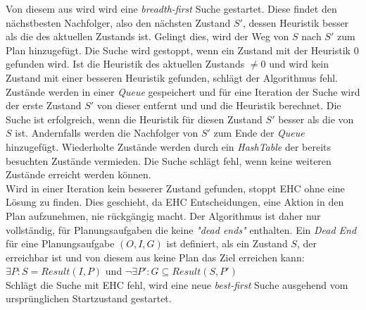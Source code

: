 Von diesem aus wird wird eine \emph{breadth-first} Suche gestartet.
Diese findet den nächstbesten Nachfolger, also den nächsten Zustand $S'$, dessen Heuristik besser als die des aktuellen Zustands ist.
Gelingt dies, wird der Weg von $S$ nach $S'$ zum Plan hinzugefügt.
Die Suche wird gestoppt, wenn ein Zustand mit der Heuristik 0 gefunden wird.
Ist die Heuristik des aktuellen Zustands $\neq 0$ und wird kein Zustand mit einer besseren Heuristik gefunden, schlägt der Algorithmus fehl.
Zustände werden in einer \emph{Queue} gespeichert und für eine Iteration der Suche wird der erste Zustand $S'$ von dieser entfernt und und die Heuristik berechnet.
Die Suche ist erfolgreich, wenn die Heuristik für diesen Zustand $S'$ besser als die von $S$ ist.
Andernfalls werden die Nachfolger von $S'$ zum Ende der \emph{Queue} hinzugefügt.
Wiederholte Zustände werden durch ein \emph{HashTable} der bereits besuchten Zustände vermieden.
Die Suche schlägt fehl, wenn keine weiteren Zustände erreicht werden können.\\
Wird in einer Iteration kein besserer Zustand gefunden, stoppt \ac{EHC} ohne eine Lösung zu finden.
Dies geschieht, da \ac{EHC} Entscheidungen, eine Aktion in den Plan aufzunehmen, nie rückgängig macht.
Der Algorithmus ist daher nur vollständig, für Planungsaufgaben die keine \emph{"dead ends"} enthalten.
Ein \emph{Dead End} für eine Planungsaufgabe $(O,I,G)$ ist definiert, als ein Zustand $S$, der erreichbar ist und von diesem aus keine Plan das Ziel erreichen kann:\\
$\exists P: S = Result(I,P)$  und  $\neg\exists P': G\subseteq Result(S,P')$\\
Schlägt die Suche mit \ac{EHC} fehl, wird eine neue \emph{best-first} Suche ausgehend vom ursprünglichen Startzustand gestartet.
